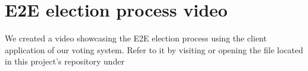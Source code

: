 \chapter{E2E election process video}\label{ch:video-of-e2e-election-process}

We created a video showcasing the \gls{E2E} election process using the client application of our voting system.
Refer to it by visiting or opening the file located in this project's repository under
